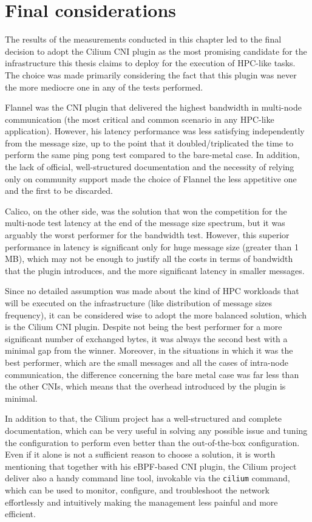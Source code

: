 \section{Final considerations}\label{sec:final-considerations}

The results of the measurements conducted in this chapter led to the final
decision to adopt the Cilium CNI plugin as the most promising candidate for the
infrastructure this thesis claims to deploy for the execution of HPC-like tasks.
The choice was made primarily considering the fact that this plugin was never
the more mediocre one in any of the tests performed.

Flannel was the CNI plugin that delivered the highest bandwidth in multi-node
communication (the most critical and common scenario in any HPC-like
application). However, his latency performance was less satisfying independently
from the message size, up to the point that it doubled/triplicated the time to
perform the same ping pong test compared to the bare-metal case.
In addition, the lack of official, well-structured documentation and the
necessity of relying only on community support made the choice of Flannel the
less appetitive one and the first to be discarded.

Calico, on the other side, was the solution that won the competition for the
multi-node test latency at the end of the message size spectrum, but it was
arguably the worst performer for the bandwidth test.
However, this superior performance in latency is significant only for huge
message size (greater than 1 MB), which may not be enough to justify all the
costs in terms of bandwidth that the plugin introduces, and the more significant
latency in smaller messages.

Since no detailed assumption was made about the kind of HPC workloads that will
be executed on the infrastructure (like distribution of message sizes
frequency), it can be considered wise to adopt the more balanced solution, which
is the Cilium CNI plugin.
Despite not being the best performer for a more significant number of exchanged
bytes, it was always the second best with a minimal gap from the winner.
Moreover, in the situations in which it was the best performer, which are the
small messages and all the cases of intra-node communication, the difference
concerning the bare metal case was far less than the other CNIs, which means
that the overhead introduced by the plugin is minimal.

In addition to that, the Cilium project has a well-structured and complete
documentation, which can be very useful in solving any possible issue and tuning
the configuration to perform even better than the out-of-the-box configuration.
Even if it alone is not a sufficient reason to choose a solution, it is worth
mentioning that together with his eBPF-based CNI plugin, the Cilium project
deliver also a handy command line tool, invokable via the \texttt{cilium}
command, which can be used to monitor, configure, and troubleshoot the network
effortlessly and intuitively making the management less painful and more
efficient.

